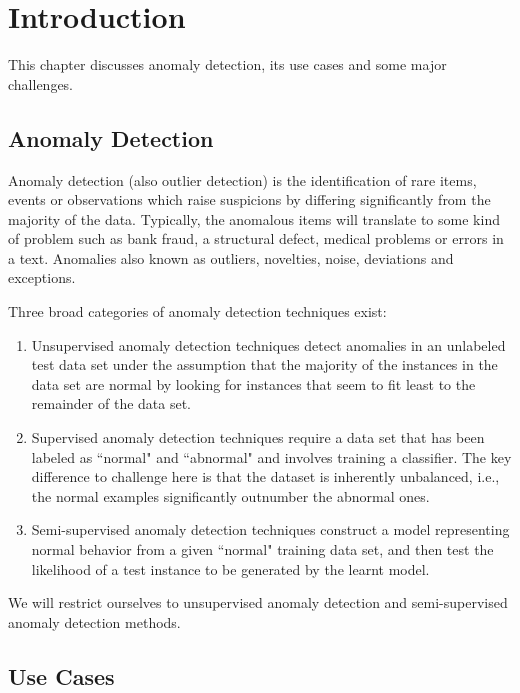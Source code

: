 \chapter{Introduction}
\label{ch:introduction}
\hspace{3mm}

This chapter discusses anomaly detection, its use cases and some major challenges.

\section{Anomaly Detection}
\label{sec:anomaly-detection-definition}

Anomaly detection (also outlier detection) is the identification of rare items, events or observations which raise suspicions by differing significantly from the majority of the data.
Typically, the anomalous items will translate to some kind of problem such as bank fraud, a structural defect, medical problems or errors in a text.
Anomalies also known as outliers, novelties, noise, deviations and exceptions.

Three broad categories of anomaly detection techniques exist:

\begin{enumerate}
    \item Unsupervised anomaly detection techniques detect anomalies in an unlabeled test data set under the assumption that the majority of the instances in the data set are normal by looking for instances that seem to fit least to the remainder of the data set.
    \item Supervised anomaly detection techniques require a data set that has been labeled as ``normal" and ``abnormal" and involves training a classifier. The key difference to challenge here is that the dataset is inherently unbalanced, i.e., the normal examples significantly outnumber the abnormal ones.
    \item Semi-supervised anomaly detection techniques construct a model representing normal behavior from a given ``normal" training data set, and then test the likelihood of a test instance to be generated by the learnt model.
\end{enumerate}

We will restrict ourselves to unsupervised anomaly detection and semi-supervised anomaly detection methods.

\section{Use Cases}
\label{sec:anomaly-detection-use-cases}

